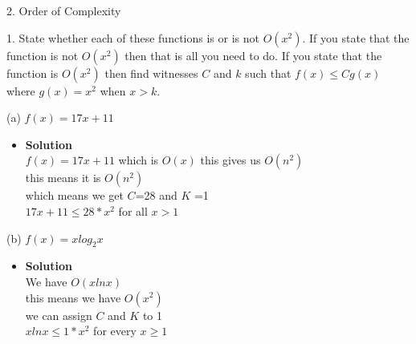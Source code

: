 \documentclass[11pt]{article}
\begin{document}
\pagebreak





\begin{flushleft}
{\Large 2. Order of Complexity}
\end{flushleft}





\begin{enumerate}

\begin{flushleft}
{\large 1. State whether each of these functions is or is not $O(x^2)$. If you state that the function is not $O(x^2)$
then that is all you need to do. If you state that the function is $O(x^2)$ then find witnesses $C$ and $k$
such that $f(x) \leq Cg(x)$ where $g(x) = x^2$ when $x > k.$}\\
\end{flushleft}


\large (a) $f(x) = 17x + 11$\\


\begin{itemize}

\item \textbf{Solution}\\
\large  $f(x) = 17x+11$ which is $O(x)$ this gives us $O(n^2)$\\
\large  this means it is $O(n^2)$\\
\large which means we get $C$=28 and $K$ =1\\
\large \therefore $ 17x+11 \leq 28*x^2$ for all $x > 1$\\


\end {itemize}


\large (b) $f(x) = xlog_2 x$\\


\begin{itemize}

\item \textbf{Solution}\\
\large  We have $O(xlnx)$\\
\large this means we have $O(x^2)$\\
\large we can assign $C$ and $K$ to 1\\
\large \therefore $ xlnx \leq 1*x^2$ for every $x \geq 1$\\



\end{itemize}
\end{enumerate}
\end{document}
